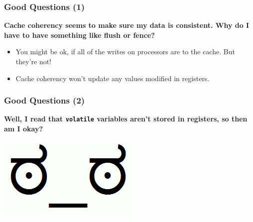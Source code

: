 \begin{frame}
  \frametitle{Good Questions (1)}

  
  {\bf Cache coherency seems to make sure my data is consistent. Why do I have
    to have something like flush or fence?}
  \begin{itemize}
    \item You might be ok, if all of the writes on processors are to the
      cache. But they're not!
    \item Cache coherency won't update any values modified in registers.
  \end{itemize}
  
\end{frame}

\begin{frame}[fragile]
  \frametitle{Good Questions (2)}

  
  {\bf Well, I read that {\tt volatile} variables aren't stored in registers,
    so then am I okay?}
  \vspace{6.2em}
  \pause

  \begin{center}
    \includegraphics[scale=0.3]{images/disapproval}    
  \end{center}
  
\end{frame}

